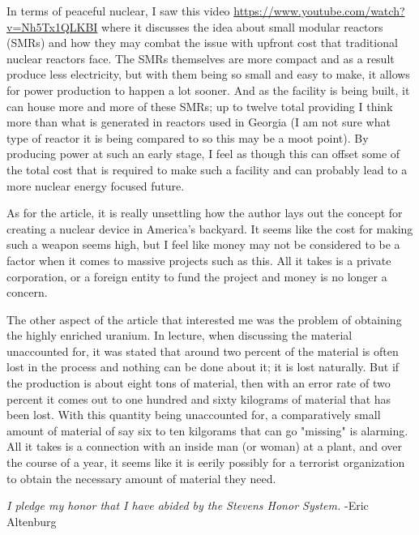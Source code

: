 \documentclass[12pt]{turabian-researchpaper}
\begin{document}
	In terms of peaceful nuclear, I saw this video \href{https://www.youtube.com/watch?v=Nh5Tx1QLKBI}{https://www.youtube.com/watch?v=Nh5Tx1QLKBI} where it discusses the idea about small modular reactors (SMRs) and how they may combat the issue with upfront cost that traditional nuclear reactors face. The SMRs themselves are more compact and as a result produce less electricity, but with them being so small and easy to make, it allows for power production to happen a lot sooner. And as the facility is being built, it can house more and more of these SMRs; up to twelve total providing I think more than what is generated in reactors used in Georgia (I am not sure what type of reactor it is being compared to so this may be a moot point). By producing power at such an early stage, I feel as though this can offset some of the total cost that is required to make such a facility and can probably lead to a more nuclear energy focused future.

	As for the article, it is really unsettling how the author lays out the concept for creating a nuclear device in America's backyard. It seems like the cost for making such a weapon seems high, but I feel like money may not be considered to be a factor when it comes to massive projects such as this. All it takes is a private corporation, or a foreign entity to fund the project and money is no longer a concern. 

	The other aspect of the article that interested me was the problem of obtaining the highly enriched uranium. In lecture, when discussing the material unaccounted for, it was stated that around two percent of the material is often lost in the process and nothing can be done about it; it is lost naturally. But if the production is about eight tons of material, then with an error rate of two percent it comes out to one hundred and sixty kilograms of material that has been lost. With this quantity being unaccounted for, a comparatively small amount of material of say six to ten kilgorams that can go "missing" is alarming. All it takes is a connection with an inside man (or woman) at a plant, and over the course of a year, it seems like it is eerily possibly for a terrorist organization to obtain the necessary amount of material they need.

\vspace*{\fill}
\noindent\textit{I pledge my honor that I have abided by the Stevens Honor System.} -Eric Altenburg
\end{document}
